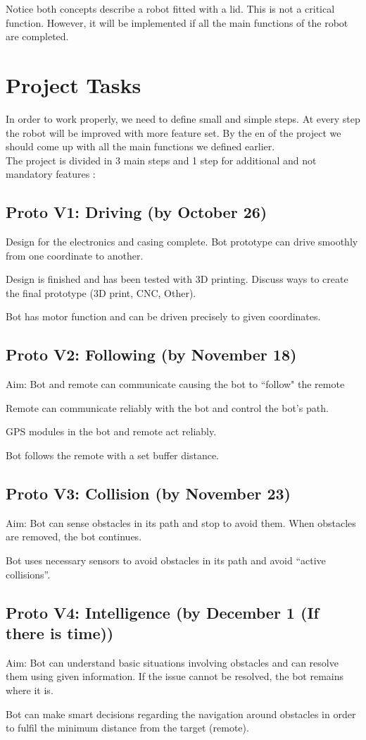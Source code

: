 Notice both concepts describe a robot fitted with a lid. This is not a critical function. However, it will be implemented if all the main functions of the robot are completed.

\newpage

\section{Project Tasks}

In order to work properly, we need to define small and simple steps. At every step the robot will be improved with more feature set. By the en of the project we should come up with all the main functions we defined earlier.\\
The project is divided in 3 main steps and 1 step for additional and not mandatory features :

\subsection{Proto V1: Driving (by October 26)}
Design for the electronics and casing complete. Bot prototype can drive smoothly from one coordinate to another. 

Design is finished and has been tested with 3D printing. Discuss ways to create the final prototype (3D print, CNC, Other). 

Bot has motor function and can be driven precisely to given coordinates. 

\subsection{Proto V2: Following (by November 18)}

Aim: Bot and remote can communicate causing the bot to “follow" the remote 

Remote can communicate reliably with the bot and control the bot’s path. 

GPS modules in the bot and remote act reliably. 

Bot follows the remote with a set buffer distance.  

\subsection{Proto V3: Collision (by November 23)}

Aim: Bot can sense obstacles in its path and stop to avoid them. When obstacles are removed, the bot continues. 

Bot uses necessary sensors to avoid obstacles in its path and avoid “active collisions”. 

\subsection{Proto V4: Intelligence (by December 1 (If there is time))}

Aim: Bot can understand basic situations involving obstacles and can resolve them using given information. If the issue cannot be resolved, the bot remains where it is. 

Bot can make smart decisions regarding the navigation around obstacles in order to fulfil the minimum distance from the target (remote). 